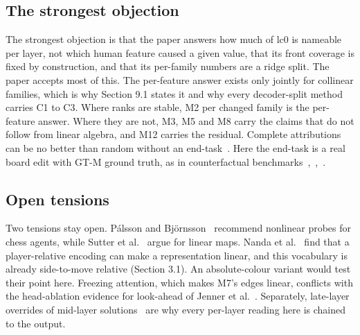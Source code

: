 \documentclass[conference]{IEEEtran}
\begin{document}
\subsection{The strongest objection}\label{sec:11.2}
The strongest objection is that the paper answers how much of lc0 is nameable per layer, not which human feature caused a given value, that its front coverage is fixed by construction, and that its per-family numbers are a ridge split. The paper accepts most of this. The per-feature answer exists only jointly for collinear families, which is why Section 9.1 states it and why every decoder-split method carries C1 to C3. Where ranks are stable, M2 per changed family is the per-feature answer. Where they are not, M3, M5 and M8 carry the claims that do not follow from linear algebra, and M12 carries the residual. Complete attributions can be no better than random without an end-task~\cite{bilodeau2024}. Here the end-task is a real board edit with GT-M ground truth, as in counterfactual benchmarks~\cite{abraham2022},~\cite{huang2024},~\cite{mueller2025}.

\subsection{Open tensions}\label{sec:11.3}
Two tensions stay open. Pálsson and Björnsson~\cite{palsson2024} recommend nonlinear probes for chess agents, while Sutter et al.~\cite{sutter2025} argue for linear maps. Nanda et al.~\cite{nanda2023} find that a player-relative encoding can make a representation linear, and this vocabulary is already side-to-move relative (Section 3.1). An absolute-colour variant would test their point here. Freezing attention, which makes M7's edges linear, conflicts with the head-ablation evidence for look-ahead of Jenner et al.~\cite{jenner2024}. Separately, late-layer overrides of mid-layer solutions~\cite{sandmann2025} are why every per-layer reading here is chained to the output.
\end{document}
